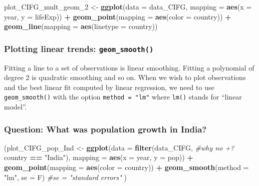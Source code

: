 \documentclass[]{article}
\newenvironment{Shaded}{\begin{snugshade}}{\end{snugshade}}
\newcommand{\KeywordTok}[1]{\textcolor[rgb]{0.13,0.29,0.53}{\textbf{#1}}}
\newcommand{\DataTypeTok}[1]{\textcolor[rgb]{0.13,0.29,0.53}{#1}}
\newcommand{\DecValTok}[1]{\textcolor[rgb]{0.00,0.00,0.81}{#1}}
\newcommand{\StringTok}[1]{\textcolor[rgb]{0.31,0.60,0.02}{#1}}
\newcommand{\CommentTok}[1]{\textcolor[rgb]{0.56,0.35,0.01}{\textit{#1}}}
\newcommand{\OperatorTok}[1]{\textcolor[rgb]{0.81,0.36,0.00}{\textbf{#1}}}
\newcommand{\NormalTok}[1]{#1}
\begin{document}
\begin{Shaded}
\begin{Highlighting}[]
\NormalTok{plot_CIFG_mult_geom_}\DecValTok{2}\NormalTok{ <-}\StringTok{ }\KeywordTok{ggplot}\NormalTok{(}\DataTypeTok{data =}\NormalTok{ data_CIFG, }
                                \DataTypeTok{mapping =} \KeywordTok{aes}\NormalTok{(}\DataTypeTok{x =}\NormalTok{ year, }
                                              \DataTypeTok{y =}\NormalTok{ lifeExp)) }\OperatorTok{+}
\StringTok{  }\KeywordTok{geom_point}\NormalTok{(}\DataTypeTok{mapping =}  \KeywordTok{aes}\NormalTok{(}\DataTypeTok{color =}\NormalTok{ country)) }\OperatorTok{+}
\StringTok{  }\KeywordTok{geom_line}\NormalTok{(}\DataTypeTok{mapping =} \KeywordTok{aes}\NormalTok{(}\DataTypeTok{linetype =}\NormalTok{ country))}
\end{Highlighting}
\end{Shaded}

\subsubsection{\texorpdfstring{Plotting linear trends:
\texttt{geom\_smooth()}}{Plotting linear trends: geom\_smooth()}}\label{plotting-linear-trends-geom_smooth}

Fitting a line to a set of observations is linear smoothing. Fitting a
polynomial of degree 2 is quadratic smoothing and so on. When we wish to
plot observations and the best linear fit computed by linear regression,
we need to use \texttt{geom\_smooth()} with the option
\texttt{method\ =\ "lm"} where \texttt{lm()} stands for ``linear
model''.

\subsubsection{Question: What was population growth in
India?}\label{question-what-was-population-growth-in-india}

\begin{Shaded}
\begin{Highlighting}[]
\NormalTok{(plot_CIFG_pop_Ind <-}\StringTok{ }\KeywordTok{ggplot}\NormalTok{(}\DataTypeTok{data =} \KeywordTok{filter}\NormalTok{(data_CIFG, }\CommentTok{#why no +?}
\NormalTok{                                           country }\OperatorTok{==}\StringTok{ "India"}\NormalTok{), }
                         \DataTypeTok{mapping =} \KeywordTok{aes}\NormalTok{(}\DataTypeTok{x =}\NormalTok{ year, }\DataTypeTok{y =}\NormalTok{ pop)) }\OperatorTok{+}
\StringTok{  }\KeywordTok{geom_point}\NormalTok{(}\DataTypeTok{mapping =} \KeywordTok{aes}\NormalTok{(}\DataTypeTok{color =}\NormalTok{ country)) }\OperatorTok{+}
\StringTok{  }\KeywordTok{geom_smooth}\NormalTok{(}\DataTypeTok{method =} \StringTok{"lm"}\NormalTok{, }\DataTypeTok{se =}\NormalTok{ F) }\CommentTok{#se = "standard errors"}
\NormalTok{ )}
\end{Highlighting}
\end{Shaded}
\end{document}

